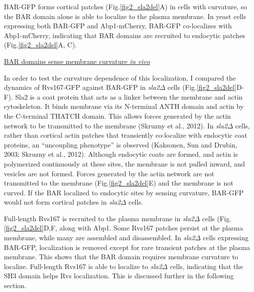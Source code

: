 	\vspace{5mm}
BAR-GFP forms cortical patches (Fig.\ref{fig2_sla2del}A) in cells with curvature, so the BAR domain alone is able to localize to the plasma membrane. In yeast cells expressing both BAR-GFP and Abp1-mCherry, BAR-GFP co-localizes with Abp1-mCherry, indicating that BAR domains are recruited to endocytic patches  (Fig.\ref{fig2_sla2del}A, C).  



	\vspace{5mm}
	\underline{BAR domains sense membrane curvature \textit{in vivo}}
	
In order to test the curvature dependence of this localization, I compared the dynamics of Rvs167-GFP against BAR-GFP in \textit{sla2$\Delta$} cells (Fig.\ref{fig2_sla2del}D-F). Sla2 is a coat protein that acts as a linker between the membrane and actin cytoskeleton. It binds membrane via its N-terminal ANTH domain and actin by the C-terminal THATCH domain. This allows forces generated by the actin network to be transmitted to the membrane (Skruzny et al., 2012). In \textit{sla2$\Delta$} cells, rather than cortical actin patches that transiently co-localize with endocytic coat proteins, an “uncoupling phenotype” is observed (Kaksonen, Sun and Drubin, 2003; Skruzny et al., 2012). Although endocytic coats are formed, and actin is polymerized continuously at these sites, the membrane is not pulled inward, and vesicles are not formed. Forces generated by the actin network are not transmitted to the membrane (Fig.\ref{fig2_sla2del}E) and the membrane is not curved. If the BAR localized to endocytic sites by sensing curvature, BAR-GFP would not form cortical patches in \textit{sla2$\Delta$} cells.

Full-length Rvs167 is recruited to the plasma membrane in \textit{sla2$\Delta$} cells  (Fig.\ref{fig2_sla2del}D,F, along with Abp1. Some Rvs167 patches persist at the plasma membrane, while many are assembled and disassembled. In \textit{sla2$\Delta$} cells expressing BAR-GFP, localization is removed except for rare transient patches at the plasma membrane. This shows that the BAR domain requires membrane curvature to localize. Full-length Rvs167 is able to localize to \textit{sla2$\Delta$} cells, indicating that the SH3 domain helps Rvs localization. This is discussed further in the following section. 






